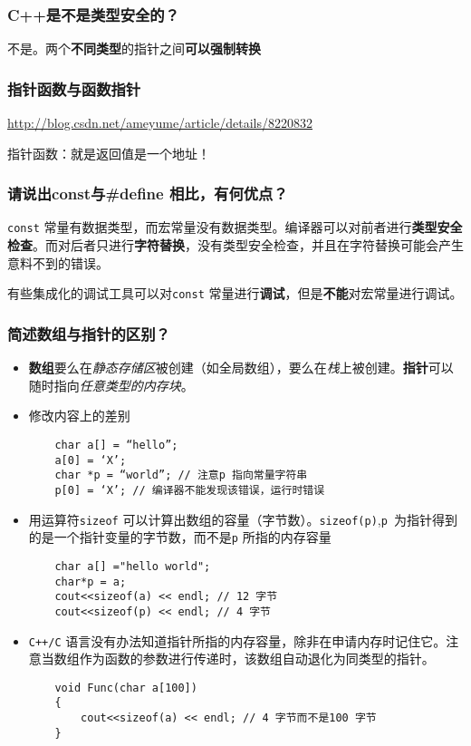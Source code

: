 \documentclass[UTF8,a4paper,8pt]{ctexart}
\begin{document}
		\subsubsection{C++是不是类型安全的？}
			不是。两个\textbf{不同类型}的指针之间\textbf{可以强制转换}
		
		\subsubsection{指针函数与函数指针}	
			\url{http://blog.csdn.net/ameyume/article/details/8220832}
			
			指针函数：就是返回值是一个地址！
			
		\subsubsection{请说出const与\#define 相比，有何优点？}
			\verb|const| 常量有数据类型，而宏常量没有数据类型。编译器可以对前者进行\textbf{类型安全检查}。而对后者只进行\textbf{字符替换}，没有类型安全检查，并且在字符替换可能会产生意料不到的错误。
			
			有些集成化的调试工具可以对\verb|const| 常量进行\textbf{调试}，但是\textbf{不能}对宏常量进行调试。
		\subsubsection{简述数组与指针的区别？}
			\begin{itemize}
				\item \textbf{数组}要么在\textit{静态存储区}被创建（如全局数组），要么在\textit{栈}上被创建。\textbf{指针}可以随时指向\textit{任意类型的内存块}。
				\item 修改内容上的差别
					\begin{lstlisting}
	char a[] = “hello”;
	a[0] = ‘X’;
	char *p = “world”; // 注意p 指向常量字符串
	p[0] = ‘X’; // 编译器不能发现该错误，运行时错误
					\end{lstlisting}
				\item 用运算符\verb|sizeof| 可以计算出数组的容量（字节数）。\verb|sizeof(p)|,\verb|p |为指针得到的是一个指针变量的字节数，而不是\verb|p| 所指的内存容量
				
					\begin{lstlisting}
	char a[] ="hello world";
	char*p = a;
	cout<<sizeof(a) << endl; // 12 字节
	cout<<sizeof(p) << endl; // 4 字节
					\end{lstlisting}
				
				\item \verb|C++/C| 语言没有办法知道指针所指的内存容量，除非在申请内存时记住它。注意当数组作为函数的参数进行传递时，该数组自动退化为同类型的指针。
					\begin{lstlisting}
	void Func(char a[100])
	{
		cout<<sizeof(a) << endl; // 4 字节而不是100 字节
	}
					\end{lstlisting}
			\end{itemize}
\end{document}
